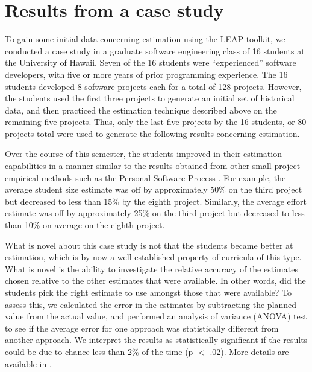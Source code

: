 \section{Results from a case study}

To gain some initial data concerning estimation using the LEAP toolkit, we
conducted a case study in a graduate software engineering class of 16
students at the University of Hawaii.  Seven of the 16 students were
``experienced'' software developers, with five or more years of prior
programming experience. The 16 students developed 8 software projects each
for a total of 128 projects. However, the students used the first three
projects to generate an initial set of historical data, and then practiced
the estimation technique described above on the remaining five projects.
Thus, only the last five projects by the 16 students, or 80 projects total were used to
generate the following results concerning estimation.

Over the course of this semester, the students improved in their estimation 
capabilities in a manner similar to the results obtained from other
small-project empirical methods such as the Personal Software Process
\cite{Hayes97,Emam96,Ferguson97,csdl-98-13}.  For
example, the average student size estimate was off by approximately 50\% on
the third project but decreased to less than 15\% by the eighth project.
Similarly, the average effort estimate was off by approximately 25\% on the
third project but decreased to less than 10\% on average on the eighth
project. 

What is novel about this case study is not that the students became
better at estimation, which is by now a well-established property of
curricula of this type.  What is novel is the ability to investigate
the relative accuracy of the estimates chosen relative to the other
estimates that were available.  In other words, did the students pick the
right estimate to use amongst those that were available?   
To assess this, we calculated the error in the estimates by subtracting the 
planned value from the actual value, and performed an analysis of variance
(ANOVA) test to see if the average error for one approach was statistically 
different from another approach. We interpret the results as statistically
significant if the results could be due to chance less than 2\% of the
time (p $<$ .02).  More details are available in \cite{csdl2-00-01}.

